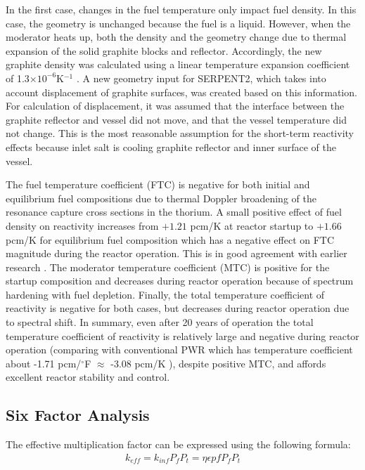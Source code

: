 In the first case, changes in the fuel temperature only impact fuel density. In 
this case, the geometry is unchanged because the fuel is a liquid. However, 
when the moderator heats up, both the density and the geometry change due to 
thermal expansion of the solid graphite blocks and reflector. Accordingly, the 
new graphite density was calculated using a linear temperature expansion 
coefficient of 1.3$\times10^{-6}$K$^{-1}$ \cite{robertson_conceptual_1971}. A new 
geometry input for SERPENT2, which takes into account displacement of graphite 
surfaces, was created based on this information. For calculation of 
displacement, it was assumed that the interface between the graphite reflector and vessel did not move,
 and that the vessel temperature did not change. This is the most reasonable assumption for
 the short-term reactivity effects because inlet salt is cooling graphite reflector and 
inner surface of the vessel.

The fuel temperature coefficient (FTC) is negative for both initial and 
equilibrium fuel compositions due to thermal Doppler broadening of the resonance 
capture cross sections in the thorium. A small positive effect of fuel density on 
reactivity increases from $+1.21$ pcm/K at reactor startup to $+1.66$ pcm/K for 
equilibrium fuel composition which has a negative effect on FTC magnitude during the 
reactor operation. This is in good agreement with earlier 
research \cite{robertson_conceptual_1971,park_whole_2015}. The moderator 
temperature coefficient (MTC) is positive for the startup composition and decreases 
during reactor operation because of spectrum hardening with fuel depletion. 
Finally, the total temperature coefficient of reactivity is negative for both 
cases, but decreases during reactor operation due to spectral shift. In 
summary, even after 20 years of operation the total temperature coefficient of 
reactivity is relatively large and negative during reactor operation (comparing 
with conventional PWR which has temperature coefficient about -1.71 pcm/$^\circ$F 
$\approx$ -3.08 pcm/K \cite{forget_integral_2018}), despite positive MTC, and 
affords excellent reactor stability and control.

\subsection{Six Factor Analysis}
The effective multiplication factor can be expressed using the following formula:
\begin{align*}
k_{eff} = k_{inf} P_f  P_t = \eta \epsilon p f P_f P_t
\end{align*}

